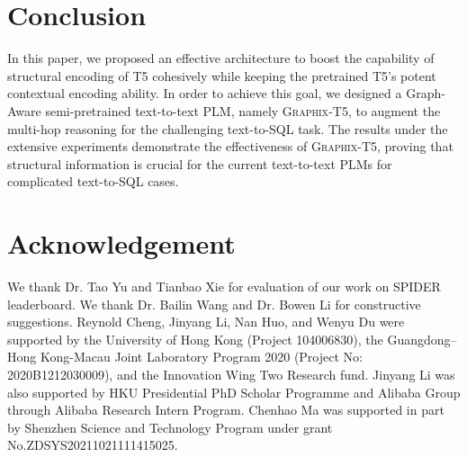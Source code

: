 \documentclass[letterpaper]{article} \usepackage{aaai23}  \usepackage{times}  \usepackage{helvet}  \usepackage{courier}  \usepackage[hyphens]{url}  \usepackage{graphicx} \usepackage{amsmath}
\newcommand{\graphix}{\textsc{Graphix}\xspace}
\begin{document}
\section{Conclusion}
In this paper, we proposed an effective architecture to boost the capability of structural encoding of T5 cohesively while keeping the pretrained T5's potent contextual encoding ability. In order to achieve this goal, we designed a Graph-Aware semi-pretrained text-to-text PLM, namely \graphix-T5, to augment the multi-hop reasoning for the challenging text-to-SQL task. The results under the extensive experiments demonstrate the effectiveness of \graphix-T5, proving that structural information is crucial for the current text-to-text PLMs for complicated text-to-SQL cases.

\section*{Acknowledgement}
We thank Dr. Tao Yu and Tianbao Xie for evaluation of our work on SPIDER leaderboard.
We thank Dr. Bailin Wang and Dr. Bowen Li for constructive suggestions.
Reynold Cheng, Jinyang Li, Nan Huo, and Wenyu Du were supported by the University of Hong Kong (Project 104006830), the Guangdong–Hong Kong-Macau Joint Laboratory Program 2020 (Project No: 2020B1212030009), and the Innovation Wing Two Research fund.
Jinyang Li was also supported by HKU Presidential PhD Scholar Programme and Alibaba Group through Alibaba Research Intern Program. Chenhao Ma was supported in part by Shenzhen Science and Technology Program under grant No.ZDSYS20211021111415025.


\newpage


\newpage
\appendix
\end{document}
